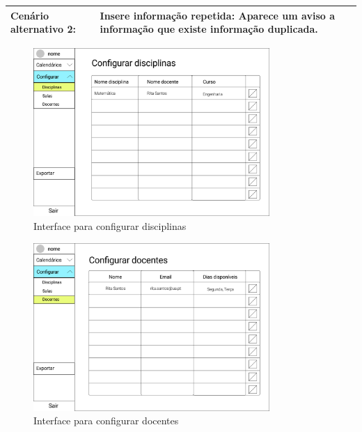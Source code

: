 \documentclass[11pt, twoside]{report}
\begin{document}
\begin{table}[H]
\begin{center}
\begin{tabularx}{\textwidth}{|l|X|}
				\hline
				Cenário alternativo 2:     & \textbf{Insere informação repetida:} Aparece um aviso a informação que existe informação duplicada.                                                                                                                                                                                                                                                                                                                                                                                                                                                               \\
				\hline
			\end{tabularx}
		\end{center}
	\end{table}
	
	\begin{figure}[H] 
		\centering 
		\includegraphics[width=0.8\textwidth,height=0.8\textheight,keepaspectratio]{image/prototipowireframes/configurardisciplinas}
		\caption{Interface para configurar disciplinas}
		\label{interfaceconfdisciplinas}
	\end{figure}
	
	
	\begin{figure}[H] 
		\centering 
		\includegraphics[width=0.8\textwidth,height=0.8\textheight,keepaspectratio]{image/prototipowireframes/configurardocentes}
		\caption{Interface para configurar docentes}
		\label{interfaceconfdocentes}
	\end{figure}
	
\end{document}
